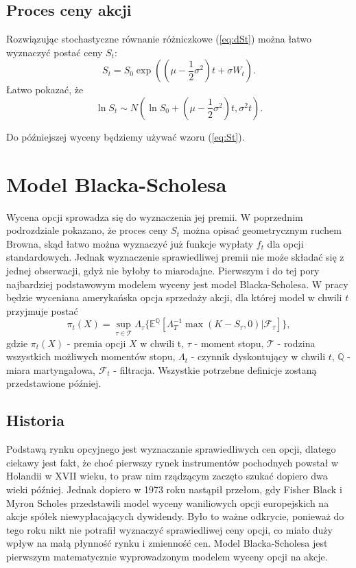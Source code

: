 \documentclass[]{pwr_wmat_praca_dyplomowa}
\theoremstyle{plain}
\numberwithin{theorem}{chapter}
\theoremstyle{definition}
\numberwithin{theorem}{chapter}
\begin{document}
\subsection{Proces ceny akcji}

Rozwiązując stochastyczne równanie różniczkowe (\ref{eq:dSt}) można łatwo wyznaczyć postać ceny $S_t$:
\begin{equation}
\label{eq:St}
S_t = S_0 \exp((\mu - \frac{1}{2}\sigma^2)t + \sigma W_t).
\end{equation}
Łatwo pokazać, że 
\begin{equation}
\label{eq:rozklad}
\ln S_t \sim N(\ln S_0 + (\mu-\frac{1}{2}\sigma^2)t, \sigma^2 t).
\end{equation}

\noindent Do późniejszej wyceny będziemy używać wzoru (\ref{eq:St}).

\section{Model Blacka-Scholesa}
Wycena opcji sprowadza się do wyznaczenia jej premii. W poprzednim podrozdziale pokazano, że proces ceny $S_t$ można opisać geometrycznym ruchem Browna, skąd łatwo można wyznaczyć już funkcje wypłaty $f_t$ dla opcji standardowych. Jednak wyznaczenie sprawiedliwej premii nie może składać się z jednej obserwacji, gdyż nie byłoby to miarodajne. Pierwszym i do tej pory najbardziej podstawowym modelem wyceny jest model Blacka-Scholesa. W pracy będzie wyceniana amerykańska opcja sprzedaży akcji, dla której model w chwili $t$ przyjmuje postać
\begin{equation}
\label{eq:B-S}
\pi_t(X) = \sup_{\tau \in \mathcal{T}} \Lambda_{\tau}\{\mathbb{E}^{\mathbb{Q}}[\Lambda_{T}^{-1}\max(K-S_{\tau},0)|\mathcal{F}_{\tau}]\},
\end{equation}
gdzie $\pi_t(X)$ - premia opcji $X$ w chwili t, $\tau$ - moment stopu, $\mathcal{T}$ - rodzina wszystkich możliwych momentów stopu, $\Lambda_t$ - czynnik dyskontujący w chwili $t$, $\mathbb{Q}$ - miara martyngałowa, $\mathcal{F}_t$ - filtracja. Wszystkie potrzebne definicje zostaną przedstawione później.

\subsection{Historia}
Podstawą rynku opcyjnego jest wyznaczanie sprawiedliwych cen opcji, dlatego ciekawy jest fakt, że choć pierwszy rynek instrumentów pochodnych powstał w Holandii w XVII wieku, to praw nim rządzącym zaczęto szukać dopiero dwa wieki później. Jednak dopiero w 1973 roku nastąpił przełom, gdy Fisher Black i Myron Scholes przedstawili model wyceny waniliowych opcji europejskich na akcje spółek niewypłacających dywidendy. Było to ważne odkrycie, ponieważ do tego roku nikt nie potrafił wyznaczyć sprawiedliwej ceny opcji, co miało duży wpływ na małą płynność rynku i zmienność cen. Model Blacka-Scholesa jest pierwszym matematycznie wyprowadzonym modelem wyceny opcji na akcje.
\end{document}
